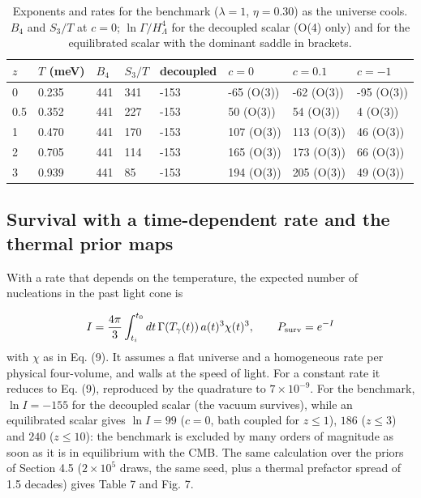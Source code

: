 \documentclass[11pt,a4paper]{article}
\begin{document}
\begin{table}[htbp]\centering\small
\caption{Exponents and rates for the benchmark ($\lambda=1$, $\eta=0.30$) as the universe cools. $B_4$ and $S_3/T$ at $c=0$; $\ln\Gamma/H_\Lambda^4$ for the decoupled scalar (O(4) only) and for the equilibrated scalar with the dominant saddle in brackets.}
\begin{tabular}{llllllll}
\toprule
$z$ & $T$ (meV) & $B_4$ & $S_3/T$ & decoupled & $c=0$ & $c=0.1$ & $c=-1$ \\ \midrule
0 & 0.235 & 441 & 341 & -153 & -65 (O(3)) & -62 (O(3)) & -95 (O(3)) \\
0.5 & 0.352 & 441 & 227 & -153 & 50 (O(3)) & 54 (O(3)) & 4 (O(3)) \\
1 & 0.470 & 441 & 170 & -153 & 107 (O(3)) & 113 (O(3)) & 46 (O(3)) \\
2 & 0.705 & 441 & 114 & -153 & 165 (O(3)) & 173 (O(3)) & 66 (O(3)) \\
3 & 0.939 & 441 & 85 & -153 & 194 (O(3)) & 205 (O(3)) & 49 (O(3)) \\
\bottomrule
\end{tabular}
\end{table}
\subsection{Survival with a time-dependent rate and the thermal prior maps}
With a rate that depends on the temperature, the expected number of nucleations in the past light cone is

\begin{equation}
I=\frac{4\pi}{3}\int_{t_i}^{t_0}dt\,\Gamma(T_\gamma(t))\,a(t)^3\chi(t)^3,\qquad P_{\rm surv}=e^{-I}
\end{equation}
with $\chi$ as in Eq. (9). It assumes a flat universe and a homogeneous rate per physical four-volume, and walls at the speed of light. For a constant rate it reduces to Eq. (9), reproduced by the quadrature to $7\times10^{-9}$. For the benchmark, $\ln I=-155$ for the decoupled scalar (the vacuum survives), while an equilibrated scalar gives $\ln I=99$ ($c=0$, bath coupled for $z\le1$), $186$ ($z\le3$) and $240$ ($z\le10$): the benchmark is excluded by many orders of magnitude as soon as it is in equilibrium with the CMB. The same calculation over the priors of Section 4.5 ($2\times10^5$ draws, the same seed, plus a thermal prefactor spread of 1.5 decades) gives Table 7 and Fig. 7.
\end{document}
